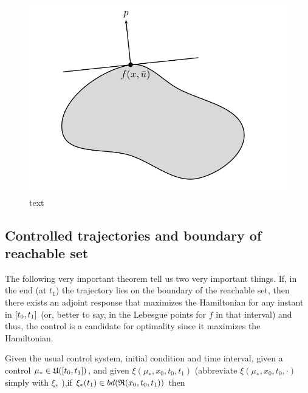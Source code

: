 \begin{figure}[h!]
	\includegraphics[width=\linewidth]{imgs/512-514.png}
	\caption{text}
	\label{fig-5.2}
\end{figure}

\subsection{Controlled trajectories and boundary of reachable set}
The following very important theorem tell us two very important things. If, in the end (at $t_1$) the trajectory lies on the boundary of the reachable set, then there exists an adjoint response that maximizes the Hamiltonian for any instant in $[t_0,t_1]$ (or, better to say, in the Lebesgue points for $f$ in that interval) and thus, the control is a candidate for optimality since it maximizes the Hamiltonian. \\

\begin{teo}
	Given the usual control system, initial condition and time interval, given a control $\mu_*\in\mathfrak{U}([t_0,t_1])$, and given $\xi(\mu_*,x_0,t_0,t_1)$ (abbreviate $\xi(\mu_*,x_0,t_0,\cdot)$ simply with $\xi_*$ ),if $\xi_*(t_1) \in bd(\mathfrak{R}(x_0,t_0,t_1))$ then 
	\label{5-16}
\end{teo}

